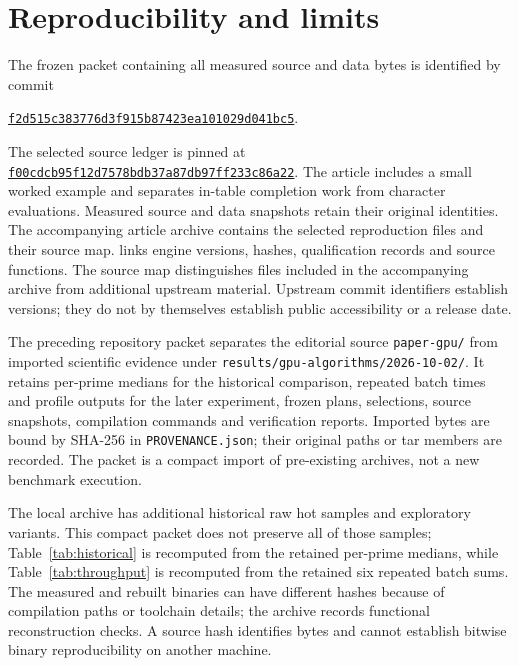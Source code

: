 \documentclass[11pt]{article}
\theoremstyle{definition}\newtheorem{remark}[theorem]{Remark}
\newcommand{\data}{\texttt{results/gpu-algorithms/2026-10-02/}}
\begin{document}
\section{Reproducibility and limits}\label{sec:reproducibility}
The frozen packet containing all measured source and data bytes is
identified by commit
\begin{center}\footnotesize
\href{https://github.com/Vulkin-prog/vdw-gpu-starter/tree/f2d515c383776d3f915b87423ea101029d041bc5}{\nolinkurl{f2d515c383776d3f915b87423ea101029d041bc5}}.
\end{center}
The selected source ledger is pinned at
\href{https://github.com/Vulkin-prog/vdw-gpu-starter/tree/f00cdcb95f12d7578bdb37a87db97ff233c86a22}{\nolinkurl{f00cdcb95f12d7578bdb37a87db97ff233c86a22}}.
The article includes a small worked example and separates in-table
completion work from character evaluations. Measured source and data
snapshots retain their original identities. The accompanying article
archive contains the selected reproduction files and their source map.
 links engine versions, hashes,
qualification records and source functions. The source map distinguishes files included in the accompanying archive
from additional upstream material. Upstream commit identifiers establish
versions; they do not by themselves establish public accessibility or a
release date.

The preceding repository packet separates the editorial source \texttt{paper-gpu/}
from imported scientific evidence under \data.
It retains per-prime medians for the historical comparison, repeated batch
times and profile outputs for the later experiment, frozen plans, selections,
source snapshots, compilation commands and verification reports. Imported
bytes are bound by SHA-256 in \texttt{PROVENANCE.json}; their original
paths or tar members are recorded. The packet is a compact import of
pre-existing archives, not a new benchmark execution.

The local archive has additional historical raw hot samples and exploratory
variants. This compact packet does not preserve all of those samples;
Table~\ref{tab:historical} is recomputed from the retained per-prime medians,
while Table~\ref{tab:throughput} is recomputed from the retained six repeated
batch sums. The measured and rebuilt binaries can have different hashes
because of compilation paths or toolchain details; the archive records
functional reconstruction checks. A source hash identifies bytes and
cannot establish bitwise binary reproducibility on another machine.
\end{document}
